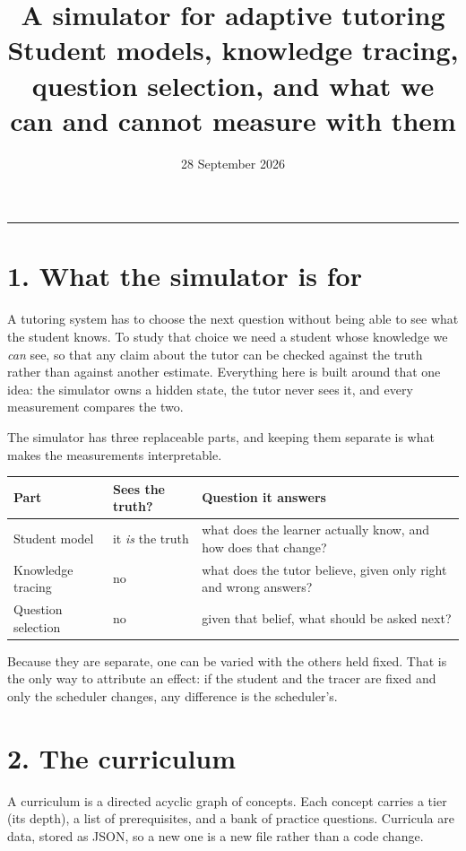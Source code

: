 \documentclass[11pt]{article}
\title{\vspace{-1.2cm}\textbf{A simulator for adaptive tutoring}\\[3pt]
\large Student models, knowledge tracing, question selection, and what we
can and cannot measure with them}
\date{\small 28 September 2026}
\author{}
\begin{document}
\maketitle
\vspace{-1.1cm}
\noindent\rule{\textwidth}{0.4pt}

\section*{1. What the simulator is for}

A tutoring system has to choose the next question without being able to see
what the student knows. To study that choice we need a student whose
knowledge we \emph{can} see, so that any claim about the tutor can be checked
against the truth rather than against another estimate. Everything here is
built around that one idea: the simulator owns a hidden state, the tutor
never sees it, and every measurement compares the two.

The simulator has three replaceable parts, and keeping them separate is what
makes the measurements interpretable.

\begin{center}
\small
\begin{tabular}{@{}llp{7.4cm}@{}}
\toprule
\textbf{Part} & \textbf{Sees the truth?} & \textbf{Question it answers}\\
\midrule
Student model & it \emph{is} the truth & what does the learner actually know, and how does that change?\\
Knowledge tracing & no & what does the tutor believe, given only right and wrong answers?\\
Question selection & no & given that belief, what should be asked next?\\
\bottomrule
\end{tabular}
\end{center}

Because they are separate, one can be varied with the others held fixed. That
is the only way to attribute an effect: if the student and the tracer are
fixed and only the scheduler changes, any difference is the scheduler's.

\section*{2. The curriculum}

A curriculum is a directed acyclic graph of concepts. Each concept carries a
tier (its depth), a list of prerequisites, and a bank of practice questions.
Curricula are data, stored as JSON, so a new one is a new file rather than a
code change.
\end{document}
